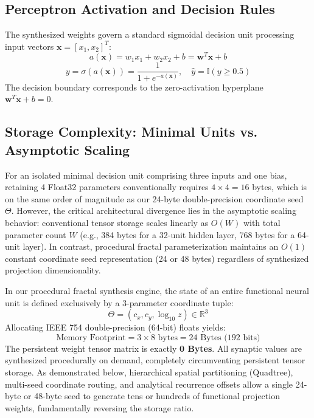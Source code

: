 \documentclass[10pt,journal,compsoc,twocolumn]{article}
\begin{document}
\subsection{Perceptron Activation and Decision Rules}
The synthesized weights govern a standard sigmoidal decision unit processing input vectors $\mathbf{x} = [x_1, x_2]^T$:
\begin{equation}
a(\mathbf{x}) = w_1 x_1 + w_2 x_2 + b = \mathbf{w}^T \mathbf{x} + b
\end{equation}
\begin{equation}
y = \sigma(a(\mathbf{x})) = \frac{1}{1 + e^{-a(\mathbf{x})}}, \quad \hat{y} = \mathbb{I}(y \ge 0.5)
\end{equation}
The decision boundary corresponds to the zero-activation hyperplane $\mathbf{w}^T \mathbf{x} + b = 0$.

\subsection{Storage Complexity: Minimal Units vs. Asymptotic Scaling}
For an isolated minimal decision unit comprising three inputs and one bias, retaining 4 Float32 parameters conventionally requires $4 \times 4 = 16$ bytes, which is on the same order of magnitude as our 24-byte double-precision coordinate seed $\Theta$. However, the critical architectural divergence lies in the asymptotic scaling behavior: conventional tensor storage scales linearly as $O(W)$ with total parameter count $W$ (e.g., 384 bytes for a 32-unit hidden layer, 768 bytes for a 64-unit layer). In contrast, procedural fractal parameterization maintains an $O(1)$ constant coordinate seed representation (24 or 48 bytes) regardless of synthesized projection dimensionality. 

In our procedural fractal synthesis engine, the state of an entire functional neural unit is defined exclusively by a 3-parameter coordinate tuple:
\begin{equation}
\Theta = (c_x, c_y, \log_{10} z) \in \mathbb{R}^3
\end{equation}
Allocating IEEE 754 double-precision (64-bit) floats yields:
\begin{equation}
\text{Memory Footprint} = 3 \times 8\text{ bytes} = 24\text{ Bytes (192 bits)}
\end{equation}
The persistent weight tensor matrix is exactly \textbf{0 Bytes}. All synaptic values are synthesized procedurally on demand, completely circumventing persistent tensor storage. As demonstrated below, hierarchical spatial partitioning (Quadtree), multi-seed coordinate routing, and analytical recurrence offsets allow a single 24-byte or 48-byte seed to generate tens or hundreds of functional projection weights, fundamentally reversing the storage ratio.
\end{document}
